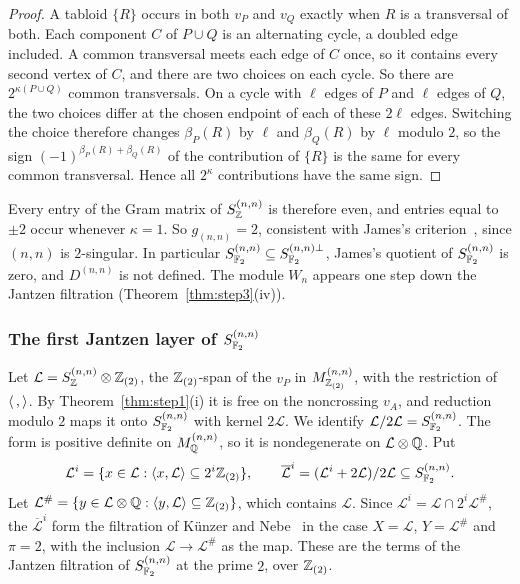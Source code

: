 \begin{proof}
A tabloid $\{R\}$ occurs in both $v_P$ and $v_Q$ exactly when $R$ is a transversal of both. Each component $C$ of $P\cup Q$ is an alternating cycle, a doubled edge included. A common transversal meets each edge of $C$ once, so it contains every second vertex of $C$, and there are two choices on each cycle. So there are $2^{\kappa(P\cup Q)}$ common transversals. On a cycle with $\ell$ edges of $P$ and $\ell$ edges of $Q$, the two choices differ at the chosen endpoint of each of these $2\ell$ edges. Switching the choice therefore changes $\beta_P(R)$ by $\ell$ and $\beta_Q(R)$ by $\ell$ modulo $2$, so the sign ${(-1)}^{\beta_P(R)+\beta_Q(R)}$ of the contribution of $\{R\}$ is the same for every common transversal. Hence all $2^{\kappa}$ contributions have the same sign.
\end{proof}

Every entry of the Gram matrix of $S^{(n,n)}_{\mathbb{Z}}$ is therefore even, and entries equal to $\pm2$ occur whenever $\kappa=1$. So $g_{(n,n)}=2$, consistent with James's criterion~\cite[10.3--10.5]{James78}, since $(n,n)$ is $2$-singular. In particular $S^{(n,n)}_{\mathbb{F}_2}\subseteq S^{(n,n)\perp}_{\mathbb{F}_2}$, James's quotient of $S^{(n,n)}_{\mathbb{F}_2}$ is zero, and $D^{(n,n)}$ is not defined. The module $W_n$ appears one step down the Jantzen filtration (Theorem~\ref{thm:step3}(iv)).

\subsubsection{The first Jantzen layer of \texorpdfstring{$S^{(n,n)}_{\mathbb{F}_2}$}{S\textasciicircum(n,n)}}\label{subsubsec:jantzen}

Let $\mathcal L=S^{(n,n)}_{\mathbb{Z}}\otimes\mathbb{Z}_{(2)}$, the $\mathbb{Z}_{(2)}$-span of the $v_P$ in $M^{(n,n)}_{\mathbb{Z}_{(2)}}$, with the restriction of $\langle\,,\rangle$. By Theorem~\ref{thm:step1}(i) it is free on the noncrossing $v_A$, and reduction modulo $2$ maps it onto $S^{(n,n)}_{\mathbb{F}_2}$ with kernel $2\mathcal L$. We identify $\mathcal L/2\mathcal L=S^{(n,n)}_{\mathbb{F}_2}$. The form is positive definite on $M^{(n,n)}_{\mathbb{Q}}$, so it is nondegenerate on $\mathcal L\otimes\mathbb{Q}$. Put
\[
\mathcal L^i=\{x\in\mathcal L:\langle x,\mathcal L\rangle\subseteq2^i\mathbb{Z}_{(2)}\},\qquad \overline{\mathcal L}^i=(\mathcal L^i+2\mathcal L)/2\mathcal L\subseteq S^{(n,n)}_{\mathbb{F}_2}.
\]
Let $\mathcal L^\#=\{y\in\mathcal L\otimes\mathbb{Q}:\langle y,\mathcal L\rangle\subseteq\mathbb{Z}_{(2)}\}$, which contains $\mathcal L$. Since $\mathcal L^i=\mathcal L\cap2^i\mathcal L^\#$, the $\overline{\mathcal L}^i$ form the filtration of Künzer and Nebe~\cite[Def.~1.3]{KN03} in the case $X=\mathcal L$, $Y=\mathcal L^\#$ and $\pi=2$, with the inclusion $\mathcal L\to\mathcal L^\#$ as the map. These are the terms of the Jantzen filtration of $S^{(n,n)}_{\mathbb{F}_2}$ at the prime $2$, over $\mathbb{Z}_{(2)}$.

